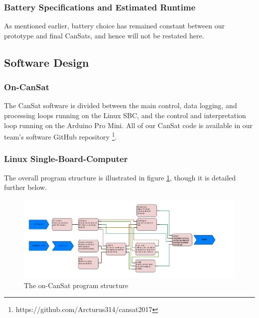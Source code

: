 \documentclass[]{report}
\begin{document}
		\subsubsection{Battery Specifications and Estimated Runtime}
		
		As mentioned earlier, battery choice has remained constant between our prototype and final CanSats, and hence will not be restated here.
		
		\subsection{Software Design}		
		
		\subsubsection{On-CanSat}
		The CanSat software is divided between the main control, data logging, and processing loops running on the Linux SBC, and the control and interpretation loop running on the Arduino Pro Mini. All of our CanSat code is available in our team's software GitHub repository \footnote{https://github.com/Arcturus314/cansat2017}.
		\subsubsection{Linux Single-Board-Computer}
		The overall program structure is illustrated in figure \ref{pstruct}, though it is detailed further below.
		
		
		\begin{figure}
			\centering
			\includegraphics[scale=0.7]{CanSat-software-diagram.png}
			\caption{The on-CanSat program structure}
			\label{pstruct}
		\end{figure}
		
\end{document}
